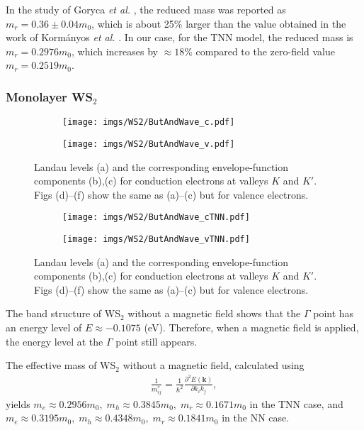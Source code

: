 \documentclass{article}
\begin{document}
In the study of Goryca \textit{et al.} \cite{goryca2019}, the reduced mass was reported as $m_{r} = 0.36 \pm 0.04 m_{0}$, which is about 25\% larger than the value obtained in the work of Korm\'{a}nyos \textit{et al.} \cite{kormanyos2015}. In our case, for the TNN model, the reduced mass is $m_{r} = 0.2976 m_{0}$, which increases by $\approx 18\%$ compared to the zero-field value $m_{r} = 0.2519 m_{0}$.



\newpage
\subsubsection*{Monolayer WS$_{2}$}
\begin{figure}[htb]
	\begin{subfigure}{0.495\textwidth}
		\centering
		\texttt{[image: imgs/WS2/ButAndWave\_c.pdf]}
	\end{subfigure}
	\begin{subfigure}{0.495\textwidth}
		\centering
		\texttt{[image: imgs/WS2/ButAndWave\_v.pdf]}
	\end{subfigure}
	\caption{Landau levels (a) and the corresponding envelope-function components (b),(c) for conduction electrons at valleys $K$ and $K'$. Figs (d)–(f) show the same as (a)–(c) but for valence electrons.}
\end{figure}
\begin{figure}[!h]
	\begin{subfigure}{0.495\textwidth}
		\centering
		\texttt{[image: imgs/WS2/ButAndWave\_cTNN.pdf]}
	\end{subfigure}
	\begin{subfigure}{0.495\textwidth}
		\centering
		\texttt{[image: imgs/WS2/ButAndWave\_vTNN.pdf]}
	\end{subfigure}
	\caption{Landau levels (a) and the corresponding envelope-function components (b),(c) for conduction electrons at valleys $K$ and $K'$. Figs (d)–(f) show the same as (a)–(c) but for valence electrons.}
\end{figure}

The band structure of WS$_{2}$ without a magnetic field shows that the $\Gamma$ point has an energy level of $E \approx -0.1075$ (eV). Therefore, when a magnetic field is applied, the energy level at the $\Gamma$ point still appears.

The effective mass of WS$_{2}$ without a magnetic field, calculated using
\begin{gather}
	\frac{1}{m_{ij}^{*}} = \frac{1}{\hbar^{2}} \frac{\partial^{2} E(\mathbf{k})}{\partial k_{i} k_{j}},
\end{gather}
yields $m_{e} \approx 0.2956 m_{0},\; m_{h} \approx 0.3845 m_{0},\; m_{r} \approx 0.1671 m_{0}$ in the TNN case, and $m_{e} \approx 0.3195 m_{0},\; m_{h} \approx 0.4348 m_{0},\; m_{r} \approx 0.1841 m_{0}$ in the NN case.
\end{document}
